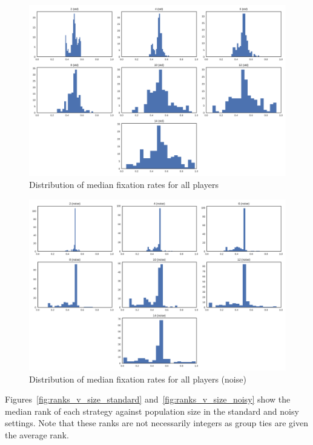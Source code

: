 \documentclass{article}
\begin{document}
\begin{figure}[!hbtp]
    \centering
    \includegraphics[width=.8\textwidth]{../img/histograms_median_fixation_rates_std.pdf}
    \caption{Distribution of median fixation rates for all players}
\end{figure}

\begin{figure}[!hbtp]
    \centering
    \includegraphics[width=.8\textwidth]{../img/histograms_median_fixation_rates_noise.pdf}
    \caption{Distribution of median fixation rates for all players (noise)}
\end{figure}

Figures~\ref{fig:ranks_v_size_standard} and~\ref{fig:ranks_v_size_noisy} show
the median rank of each strategy against population size in the standard and
noisy settings. Note that these ranks are not necessarily integers as group ties
are given the average rank.
\end{document}
